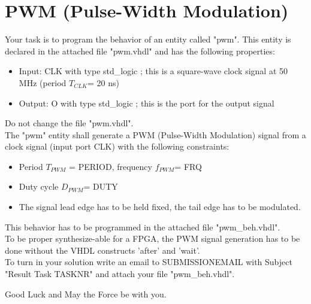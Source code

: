 \documentclass[a4paper,12pt]{article}
\begin{document}
\pagestyle{empty}
\setlength{\parindent}{0em}
\section*{PWM (Pulse-Width Modulation)}
Your task is to program the behavior of an entity called "pwm". This entity is declared in the attached file "pwm.vhdl" and has the following properties:

\begin{itemize}
\item Input:  CLK with type std\_logic ; this is a square-wave clock signal at 50 MHz (period $T_{CLK}$= 20 ns)
\item Output: O with type std\_logic ; this is the port for the output signal
\end{itemize}
\begin{center}
\end{center}

Do not change the file "pwm.vhdl".\\

The "pwm" entity shall generate a PWM (Pulse-Width Modulation) signal from a clock signal (input port CLK) with the following constraints:
\begin{itemize}
\item Period $T_{PWM}$ = {{PERIOD}}, frequency $f_{PWM}$= {{FRQ}}
\item Duty cycle $D_{PWM}$= {{DUTY}}
\item The signal lead edge has to be held fixed, the tail edge has to be modulated.
\end{itemize}
\vspace{0.3cm}

This behavior has to be programmed in the attached file "pwm\_beh.vhdl".
\\

To be proper synthesize-able for a FPGA, the PWM signal generation has to be done without the VHDL constructs 'after' and 'wait'.
\\

To turn in your solution write an email to {{SUBMISSIONEMAIL}} with Subject "Result Task {{TASKNR}}" and attach your file "pwm\_beh.vhdl".

\vspace{0.7cm}

Good Luck and May the Force be with you.
\end{document}
